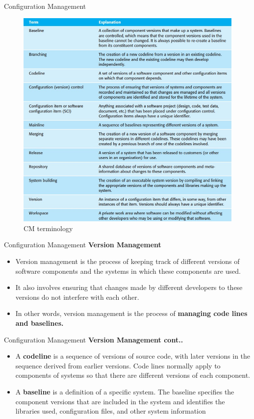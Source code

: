 \documentclass{beamer}
\begin{document}
\begin{frame}{Configuration Management}
	\begin{figure}
	\includegraphics[scale=.5]{img/m4_11}
	\caption{CM 
		terminology}
\end{figure}
\end{frame}
\begin{frame}{Configuration Management}
\textbf{Version Management}
\begin{itemize}
	\item Version management is the process of keeping track of different versions of software components and 
	the systems in which these components are used.
	\item It also involves ensuring that changes made by 
	different developers to these versions do not interfere with each other. \item In other words, version 
	management is the process of \textbf{managing code lines and baselines.}
\end{itemize}
\end{frame}
\begin{frame}{Configuration Management}
	\textbf{Version Management cont..}
	\begin{itemize}
		\item A \textbf{codeline} is a sequence of versions of source code, with later versions in the sequence derived from 
		earlier versions. Code lines normally apply to components of systems so that there are different 
		versions of each component. 
		\item A \textbf{baseline} is a definition of a specific system. The baseline specifies the component versions that are 
		included in the system and identifies the libraries used, configuration files, and other system 
		information

	\end{itemize}
\end{frame}
\end{document}
